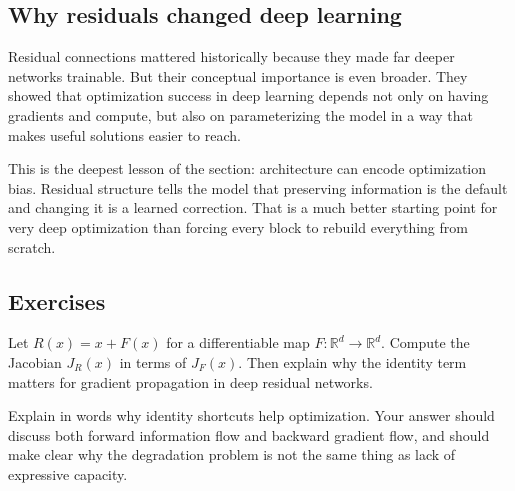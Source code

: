 \begin{center}
\begin{center}
\begin{center}
\subsection*{Why residuals changed deep learning}

Residual connections mattered historically because they made far deeper networks trainable.
But their conceptual importance is even broader.
They showed that optimization success in deep learning depends not only on having gradients and compute, but also on parameterizing the model in a way that makes useful solutions easier to reach.

\medskip

This is the deepest lesson of the section:
architecture can encode optimization bias.
Residual structure tells the model that preserving information is the default and changing it is a learned correction.
That is a much better starting point for very deep optimization than forcing every block to rebuild everything from scratch.



\subsection*{Exercises}

\begin{exercise}
Let $R(x)=x+F(x)$ for a differentiable map $F: \mathbb R^d \to \mathbb R^d$.
Compute the Jacobian $J_R(x)$ in terms of $J_F(x)$.
Then explain why the identity term matters for gradient propagation in deep residual networks.
\end{exercise}

\begin{exercise}
Explain in words why identity shortcuts help optimization.
Your answer should discuss both forward information flow and backward gradient flow, and should make clear why the degradation problem is not the same thing as lack of expressive capacity.
\end{exercise}


\end{center}
\end{center}
\end{center}
